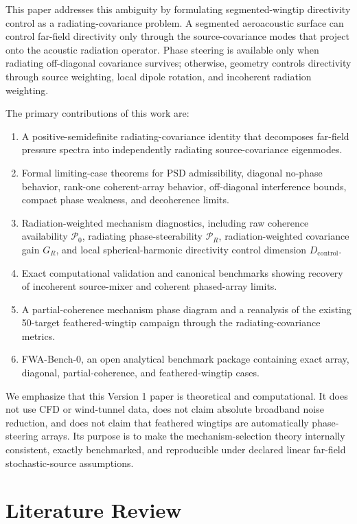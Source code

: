 \documentclass[11pt]{article}
\begin{document}
This paper addresses this ambiguity by formulating segmented-wingtip directivity control as a radiating-covariance problem. A segmented aeroacoustic surface can control far-field directivity only through the source-covariance modes that project onto the acoustic radiation operator. Phase steering is available only when radiating off-diagonal covariance survives; otherwise, geometry controls directivity through source weighting, local dipole rotation, and incoherent radiation weighting.

The primary contributions of this work are:
\begin{enumerate}
    \item A positive-semidefinite radiating-covariance identity that decomposes far-field pressure spectra into independently radiating source-covariance eigenmodes.
    \item Formal limiting-case theorems for PSD admissibility, diagonal no-phase behavior, rank-one coherent-array behavior, off-diagonal interference bounds, compact phase weakness, and decoherence limits.
    \item Radiation-weighted mechanism diagnostics, including raw coherence availability $\mathcal P_0$, radiating phase-steerability $\mathcal P_R$, radiation-weighted covariance gain $G_R$, and local spherical-harmonic directivity control dimension $D_{\mathrm{control}}$.
    \item Exact computational validation and canonical benchmarks showing recovery of incoherent source-mixer and coherent phased-array limits.
    \item A partial-coherence mechanism phase diagram and a reanalysis of the existing 50-target feathered-wingtip campaign through the radiating-covariance metrics.
    \item FWA-Bench-0, an open analytical benchmark package containing exact array, diagonal, partial-coherence, and feathered-wingtip cases.
\end{enumerate}

We emphasize that this Version 1 paper is theoretical and computational. It does not use CFD or wind-tunnel data, does not claim absolute broadband noise reduction, and does not claim that feathered wingtips are automatically phase-steering arrays. Its purpose is to make the mechanism-selection theory internally consistent, exactly benchmarked, and reproducible under declared linear far-field stochastic-source assumptions.

\section{Literature Review}
\end{document}
